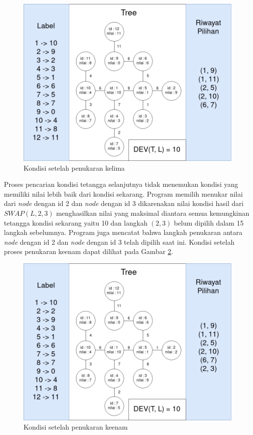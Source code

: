 \begin{figure}[ht]
	\centering\includegraphics[width=1\textwidth]{bab5/figures/uji_coba_6.png}
	\caption{Kondisi setelah penukaran kelima}
	\label{fig:uji_coba_6}
\end{figure}

Proses pencarian kondisi tetangga selanjutnya tidak menemukan kondisi yang memiliki nilai lebih baik dari kondisi sekarang. Program memilih menukar nilai dari \textit{node} dengan id 2 dan \textit{node} dengan id 3 dikarenakan nilai kondisi hasil dari $ SWAP(L, 2, 3) $ menghasilkan nilai yang maksimal diantara semua kemungkinan tetangga kondisi sekarang yaitu 10 dan langkah $ (2,3) $ belum dipilih dalam 15 langkah sebelumnya. Program juga mencatat bahwa langkah penukaran antara \textit{node} dengan id 2 dan \textit{node} dengan id 3 telah dipilih saat ini. Kondisi setelah proses penukaran keenam dapat dilihat pada Gambar \ref{fig:uji_coba_7}.

\begin{figure}[ht]
	\centering\includegraphics[width=1\textwidth]{bab5/figures/uji_coba_7.png}
	\caption{Kondisi setelah penukaran keenam}
	\label{fig:uji_coba_7}
\end{figure}


